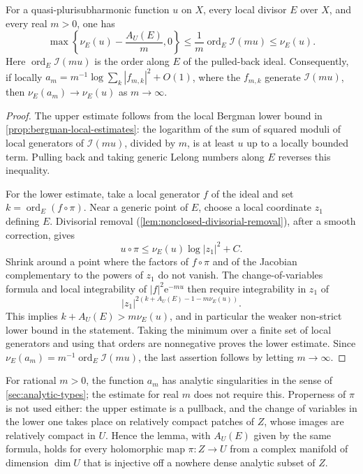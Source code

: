 \begin{lemma}\label{lem:bergman-divisorial-error}
For a quasi-plurisubharmonic function $u$ on $X$, every local divisor $E$ over $X$, and every real $m>0$, one has
\[
 \max\!\left\{\nu_E(u)-\frac{A_U(E)}m,0\right\}
 \leq \frac1m\operatorname{ord}_E\mathcal I(mu)
 \leq \nu_E(u).
\]
Here $\operatorname{ord}_E\mathcal I(mu)$ is the order along $E$ of the pulled-back ideal. Consequently, if locally $a_m=m^{-1}\log\sum_k|f_{m,k}|^2+O(1)$, where the $f_{m,k}$ generate $\mathcal I(mu)$, then $\nu_E(a_m)\to\nu_E(u)$ as $m\to\infty$.
\end{lemma}
\begin{proof}
The upper estimate follows from the local Bergman lower bound in \cref{prop:bergman-local-estimates}: the logarithm of the sum of squared moduli of local generators of $\mathcal I(mu)$, divided by $m$, is at least $u$ up to a locally bounded term. Pulling back and taking generic Lelong numbers along $E$ reverses this inequality.

For the lower estimate, take a local generator $f$ of the ideal and set $k=\operatorname{ord}_E(f\circ\pi)$. Near a generic point of $E$, choose a local coordinate $z_1$ defining $E$. Divisorial removal (\cref{lem:nonclosed-divisorial-removal}), after a smooth correction, gives
\[
 u\circ\pi\leq\nu_E(u)\log|z_1|^2+C.
\]
Shrink around a point where the factors of $f\circ\pi$ and of the Jacobian complementary to the powers of $z_1$ do not vanish. The change-of-variables formula and local integrability of $|f|^2\mathrm{e}^{-mu}$ then require integrability in $z_1$ of
\[
 |z_1|^{2(k+A_U(E)-1-m\nu_E(u))}.
\]
This implies $k+A_U(E)>m\nu_E(u)$, and in particular the weaker non-strict lower bound in the statement. Taking the minimum over a finite set of local generators and using that orders are nonnegative proves the lower estimate. Since $\nu_E(a_m)=m^{-1}\operatorname{ord}_E\mathcal I(mu)$, the last assertion follows by letting $m\to\infty$.
\end{proof}

For rational $m>0$, the function $a_m$ has analytic singularities in the sense of \cref{sec:analytic-types}; the estimate for real $m$ does not require this. Properness of $\pi$ is not used either: the upper estimate is a pullback, and the change of variables in the lower one takes place on relatively compact patches of $Z$, whose images are relatively compact in $U$. Hence the lemma, with $A_U(E)$ given by the same formula, holds for every holomorphic map $\pi\colon Z\to U$ from a complex manifold of dimension $\dim U$ that is injective off a nowhere dense analytic subset of $Z$.

